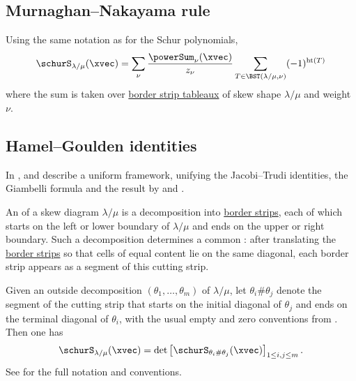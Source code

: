 \subsection[skewSchurMurnaghanNakayama]{Murnaghan--Nakayama rule}

Using the same notation as for the Schur polynomials,
\begin{equation*}
 \schurS_{\lambda/\mu}(\xvec)
  = \sum_{\nu} \frac{\powerSum_{\nu}(\xvec)}{z_\nu} \sum_{T \in \BST(\lambda/\mu,\nu)} (-1)^{\mathrm{ht}(T)}
\end{equation*}
where the sum is taken over \hyperref[borderStripTableauxDefinition]{border strip tableaux}
of skew shape $\lambda/\mu$ and weight $\nu$.


\subsection[schurStripDecompFormula]{Hamel--Goulden identities}

In \cite{HamelGoulden1995},  and  describe a
uniform framework, unifying the Jacobi--Trudi identities, the Giambelli formula and
the result by  and  \cite{LascouxPragacz1988}.

An \label{outsideDecomposition} of a skew diagram
$\lambda/\mu$ is a
decomposition into \hyperref[skewShapes]{border strips}, each of which starts on the left or lower
boundary of $\lambda/\mu$ and ends on the upper or right boundary.  Such a
decomposition determines a common \label{cuttingStrip}:
after translating the
\hyperref[skewShapes]{border strips} so that cells of equal content lie on the same diagonal, each
border strip appears as a segment of this cutting strip.

Given an outside decomposition $(\theta_1,\dotsc,\theta_m)$ of $\lambda/\mu$,
let $\theta_i\#\theta_j$ denote the segment of the cutting strip that starts on
the initial diagonal of $\theta_j$ and ends on the terminal diagonal of
$\theta_i$, with the usual empty and zero conventions from
\cite{HamelGoulden1995}.  Then
one has
\[
\schurS_{\lambda/\mu}(\xvec) = \det\left[ \schurS_{\theta_i \# \theta_j}(\xvec) \right]_{1\leq i,j \leq m}.
\]
See \cite{HamelGoulden1995} for the full notation and conventions.

